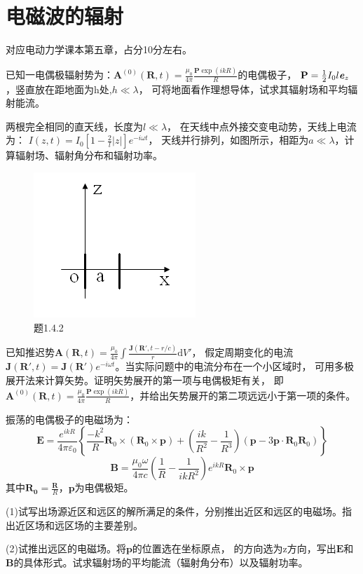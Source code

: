 \section{电磁波的辐射}
对应电动力学课本第五章，占分10分左右。

\begin{question}
    已知一电偶极辐射势为：$\mathbf{A}^{(0)}(\mathbf{R},t)=\frac{\mu_0}{4\pi}\frac{\mathbf{P}\exp (ikR)}{R}$的电偶极子，
    $\mathbf{P}=\frac{1}{2} I_0 l \textbf{\textit{e}}_z$，竖直放在距地面为h处,$h \ll \lambda$，
     可将地面看作理想导体，试求其辐射场和平均辐射能流。
\end{question}

\begin{question}
    两根完全相同的直天线，长度为$l\ll \lambda$，
    在天线中点外接交变电动势，天线上电流为： $I(z,t)=I_0[1-\frac{2}{l}\left| z \right|]\textit{e}^{-i\omega t}$，
    天线并行排列，如图所示，相距为$a\ll \lambda$，计算辐射场、辐射角分布和辐射功率。
    \begin{figure}[ht]
        \centering
        \includegraphics[height=3 cm]{images/q4_1.png}
        \caption{题1.4.2}
    \end{figure}
\end{question}

\begin{question}
    已知推迟势$\mathbf{A}(\mathbf{R},t)=\frac{\mu_0}{4\pi}\int \frac{\mathbf{J}(\mathbf{R}',t-r/c)}{r} \mathrm{d}V'$，
    假定周期变化的电流$\mathbf{J}(\mathbf{R}',t)=\mathbf{J}(\mathbf{R}')\textit{e}^{-i\omega t}$。当实际问题中的电流分布在一个小区域时，
    可用多极展开法来计算矢势。证明矢势展开的第一项与电偶极矩有关，
    即$\mathbf{A}^{(0)}(\mathbf{R},t)=\frac{\mu_0}{4\pi}\frac{\mathbf{P}\exp (ikR)}{R}$，并给出矢势展开的第二项远远小于第一项的条件。
\end{question}

\begin{question}
    振荡的电偶极子的电磁场为：
    $$\mathbf{E}=\frac{\textit{e}^{ikR}}{4\pi\varepsilon_0 }\left \{ \frac{-k^2}{R}\mathbf{R}_0\times(\mathbf{R}_0\times \mathbf{p})+(\frac{ik}{R^2}-\frac{1}{R^3})(\mathbf{p}-3\mathbf{p}\cdot\mathbf{R}_0\mathbf{R}_0) \right \}$$
    $$\mathbf{B}=\frac{\mu_0 \omega }{4\pi c}(\frac{1}{R}-\frac{1}{ikR^2})\textit{e}^{ikR}\mathbf{R}_0\times \mathbf{p}$$
     其中$\mathbf{R_0}=\frac{\mathbf{R}}{R}$，$\mathbf{p}$为电偶极矩。
    
     \noindent (1)试写出场源近区和远区的解所满足的条件，分别推出近区和远区的电磁场。指出近区场和远区场的主要差别。
    
     \noindent (2)试推出远区的电磁场。将$\mathbf{p}$的位置选在坐标原点， 的方向选为z方向，写出$\mathbf{E}$和$\mathbf{B}$的具体形式。试求辐射场的平均能流（辐射角分布）以及辐射功率。
\end{question}

